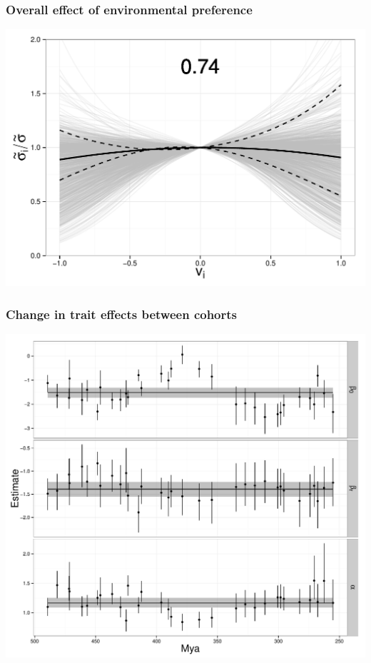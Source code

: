 \documentclass{beamer}
\begin{document}
\begin{frame}
  \frametitle{Overall effect of environmental preference}
  
  \includegraphics[width = \textwidth,height = 0.8\textheight,keepaspectratio = true]{figure/environ_quad}
\end{frame}

\begin{frame}
  \frametitle{Change in trait effects between cohorts}
  
  \begin{center}
    \includegraphics[width = \textwidth,height = 0.8\textheight,keepaspectratio = true]{figure/cohort_series}
  \end{center}
\end{frame}
\end{document}
